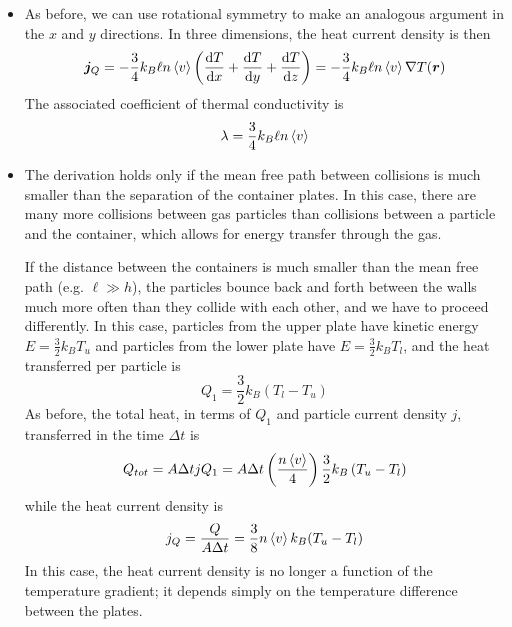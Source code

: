 \documentclass[11pt, a4paper]{article}
\begin{document}
\begin{itemize}
	\item As before, we can use rotational symmetry to make an analogous argument in the $ x $ and $ y $ directions. In three dimensions, the heat current density is then
	\begin{equation*}
		\bm{j}_{Q} = - \frac{3}{4}  k_{B} \ell n \expval{v} \left(\dv{T}{x} + \dv{T}{y} + \dv{T}{z}\right) = - \frac{3}{4}  k_{B} \ell n \expval{v} \nabla T(\bm{r})
	\end{equation*}
	The associated coefficient of thermal conductivity is
	\begin{equation*}
		\lambda = \frac{3}{4}  k_{B} \ell n \expval{v}
	\end{equation*}
	
	\item The derivation holds only if the mean free path between collisions is much smaller than the separation of the container plates. In this case, there are many more collisions between gas particles than collisions between a particle and the container, which allows for energy transfer through the gas.
	
	If the distance between the containers is much smaller than the mean free path (e.g. $ \ell \gg h $), the particles bounce back and forth between the walls much more often than they collide with each other, and we have to proceed differently. In this case, particles from the upper plate have kinetic energy $ E = \frac{3}{2}k_{B}T_{u} $ and particles from the lower plate have $  E = \frac{3}{2}k_{B}T_{l} $, and the heat transferred per particle is
	\begin{equation*}
		Q_{1} = \frac{3}{2}k_{B}\left(T_{l} - T_{u} \right)
	\end{equation*}
	As before, the total heat, in terms of $ Q_{1} $ and particle current density $ j $, transferred in the time $ \Delta t $ is
	\begin{equation*}
		Q_{tot} = A \Delta t j Q_{1} = A \Delta t \left(\frac{n \expval{v}}{4} \right)\frac{3}{2}k_{B}\left(T_{u} - T_{l} \right)
	\end{equation*}
	while the heat current density is
	\begin{equation*}
		j_{Q} = \frac{Q}{A \Delta t} = \frac{3}{8} n \expval{v} k_{B} (T_{u} - T_{l})
	\end{equation*}
	In this case, the heat current density is no longer a function of the temperature gradient; it depends simply on the temperature difference between the plates. 
	
\end{itemize}
\end{document}
